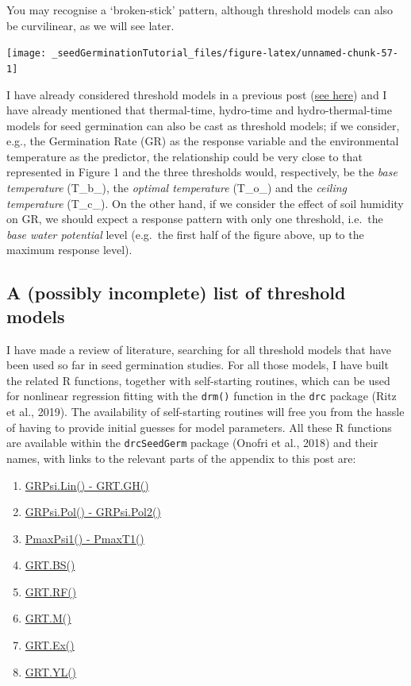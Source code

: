 \documentclass[
]{book}
\providecommand{\tightlist}{%
  \setlength{\itemsep}{0pt}\setlength{\parskip}{0pt}}
\begin{document}
You may recognise a `broken-stick' pattern, although threshold models can also be curvilinear, as we will see later.

\texttt{[image: \_seedGerminationTutorial\_files/figure-latex/unnamed-chunk-57-1]}

I have already considered threshold models in a previous post (\href{https://www.statforbiology.com/2021/stat_seedgermination_htt2step/}{see here}) and I have already mentioned that thermal-time, hydro-time and hydro-thermal-time models for seed germination can also be cast as threshold models; if we consider, e.g., the Germination Rate (GR) as the response variable and the environmental temperature as the predictor, the relationship could be very close to that represented in Figure 1 and the three thresholds would, respectively, be the \emph{base temperature} (T\_b\_), the \emph{optimal temperature} (T\_o\_) and the \emph{ceiling temperature} (T\_c\_). On the other hand, if we consider the effect of soil humidity on GR, we should expect a response pattern with only one threshold, i.e.~the \emph{base water potential} level (e.g.~the first half of the figure above, up to the maximum response level).

\hypertarget{a-possibly-incomplete-list-of-threshold-models}{%
\subsection{A (possibly incomplete) list of threshold models}\label{a-possibly-incomplete-list-of-threshold-models}}

I have made a review of literature, searching for all threshold models that have been used so far in seed germination studies. For all those models, I have built the related R functions, together with self-starting routines, which can be used for nonlinear regression fitting with the \texttt{drm()} function in the \texttt{drc} package (Ritz et al., 2019). The availability of self-starting routines will free you from the hassle of having to provide initial guesses for model parameters. All these R functions are available within the \texttt{drcSeedGerm} package (Onofri et al., 2018) and their names, with links to the relevant parts of the appendix to this post are:

\begin{enumerate}
\def\labelenumi{\arabic{enumi}.}
\tightlist
\item
  \protect\hyperlink{grpsilin---grt.gh}{GRPsi.Lin() - GRT.GH()}
\item
  \protect\hyperlink{grpsipol---grpsipol2}{GRPsi.Pol() - GRPsi.Pol2()}
\item
  \protect\hyperlink{pmaxpsi1-and-pmaxt1}{PmaxPsi1() - PmaxT1()}
\item
  \protect\hyperlink{grt.bs}{GRT.BS()}
\item
  \protect\hyperlink{grt.rf}{GRT.RF()}
\item
  \protect\hyperlink{grt.m}{GRT.M()}
\item
  \protect\hyperlink{grt.ex}{GRT.Ex()}
\item
  \protect\hyperlink{grt.yl}{GRT.YL()}
\end{enumerate}
\end{document}
